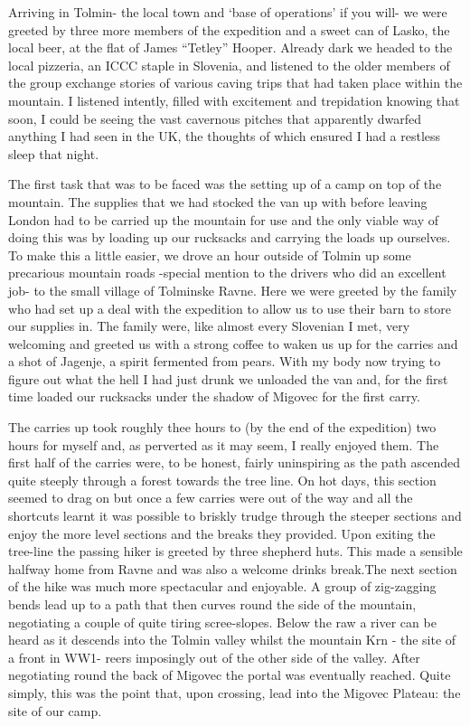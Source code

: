 Arriving in Tolmin- the local town and `base of operations' if you will-
we were greeted by three more members of the expedition and a sweet can
of Lasko, the local beer, at the flat of James ``Tetley'' Hooper.
Already dark we headed to the local pizzeria, an ICCC staple in
Slovenia, and listened to the older members of the group exchange
stories of various caving trips that had taken place within the
mountain. I listened intently, filled with excitement and trepidation
knowing that soon, I could be seeing the vast cavernous pitches that
apparently dwarfed anything I had seen in the UK, the thoughts of which
ensured I had a restless sleep that night.

The first task that was to be faced was the setting up of a camp on top
of the mountain. The supplies that we had stocked the van up with before
leaving London had to be carried up the mountain for use and the only
viable way of doing this was by loading up our rucksacks and carrying
the loads up ourselves. To make this a little easier, we drove an hour
outside of Tolmin up some precarious mountain roads -special mention to
the drivers who did an excellent job- to the small village of Tolminske
Ravne. Here we were greeted by the family who had set up a deal with the
expedition to allow us to use their barn to store our supplies in. The
family were, like almost every Slovenian I met, very welcoming and
greeted us with a strong coffee to waken us up for the carries and a
shot of Jagenje, a spirit fermented from pears. With my body now trying
to figure out what the hell I had just drunk we unloaded the van and,
for the first time loaded our rucksacks under the shadow of Migovec for
the first carry.

The carries up took roughly thee hours to (by the end of the expedition)
two hours for myself and, as perverted as it may seem, I really enjoyed
them. The first half of the carries were, to be honest, fairly
uninspiring as the path ascended quite steeply through a forest towards
the tree line. On hot days, this section seemed to drag on but once a
few carries were out of the way and all the shortcuts learnt it was
possible to briskly trudge through the steeper sections and enjoy the
more level sections and the breaks they provided. Upon exiting the
tree-line the passing hiker is greeted by three shepherd huts. This made
a sensible halfway home from Ravne and was also a welcome drinks
break.The next section of the hike was much more spectacular and
enjoyable. A group of zig-zagging bends lead up to a path that then
curves round the side of the mountain, negotiating a couple of quite
tiring scree-slopes. Below the raw a river can be heard as it descends
into the Tolmin valley whilst the mountain Krn - the site of a front in
WW1- reers imposingly out of the other side of the valley. After
negotiating round the back of Migovec the portal was eventually reached.
Quite simply, this was the point that, upon crossing, lead into the
Migovec Plateau: the site of our camp.

